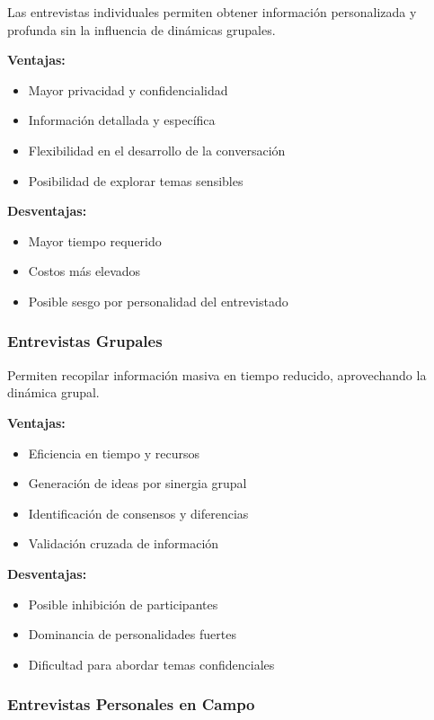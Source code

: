 \documentclass[12pt,letterpaper,oneside]{book}
\begin{document}
Las entrevistas individuales permiten obtener información personalizada y profunda sin la influencia de dinámicas grupales.

\textbf{Ventajas:}
\begin{itemize}
\item Mayor privacidad y confidencialidad
\item Información detallada y específica
\item Flexibilidad en el desarrollo de la conversación
\item Posibilidad de explorar temas sensibles
\end{itemize}

\textbf{Desventajas:}
\begin{itemize}
\item Mayor tiempo requerido
\item Costos más elevados
\item Posible sesgo por personalidad del entrevistado
\end{itemize}

\subsubsection{Entrevistas Grupales}

Permiten recopilar información masiva en tiempo reducido, aprovechando la dinámica grupal.

\textbf{Ventajas:}
\begin{itemize}
\item Eficiencia en tiempo y recursos
\item Generación de ideas por sinergia grupal
\item Identificación de consensos y diferencias
\item Validación cruzada de información
\end{itemize}

\textbf{Desventajas:}
\begin{itemize}
\item Posible inhibición de participantes
\item Dominancia de personalidades fuertes
\item Dificultad para abordar temas confidenciales
\end{itemize}

\subsubsection{Entrevistas Personales en Campo}
\end{document}
